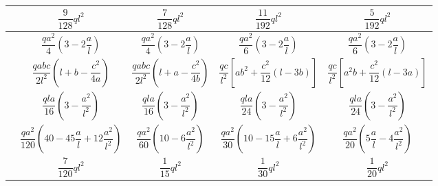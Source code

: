 \begin{table}[H]
{\begin{tabular}{m{4cm}cccc}
         & \large{$\dfrac{9}{128}ql^2$} & \large{$\dfrac{7}{128}ql^2$} & \large{$\dfrac{11}{192}ql^2$} & \large{$\dfrac{5}{192}ql^2$} \\ \midrule
         & \large{$\dfrac{qa^2}{4}\left(3-2\dfrac{a}{l}\right)$} & \large{$\dfrac{qa^2}{4}\left(3-2\dfrac{a}{l}\right)$} & \large{$\dfrac{qa^2}{6}\left(3-2\dfrac{a}{l}\right)$} & \large{$\dfrac{qa^2}{6}\left(3-2\dfrac{a}{l}\right)$} \\ \midrule
         & \large{$\dfrac{qabc}{2l^2}\left(l+b-\dfrac{c^2}{4a}\right)$} & \large{$\dfrac{qabc}{2l^2}\left(l+a-\dfrac{c^2}{4b}\right)$} & \large{$\dfrac{qc}{l^2}\left[ab^2+\dfrac{c^2}{12}\left(l-3b\right)\right]$} & \large{$\dfrac{qc}{l^2}\left[a^2b+\dfrac{c^2}{12}\left(l-3a\right)\right]$} \\ \midrule
         & \large{$\dfrac{qla}{16}\left(3-\dfrac{a^2}{l^2}\right)$} & \large{$\dfrac{qla}{16}\left(3-\dfrac{a^2}{l^2}\right)$} & \large{$\dfrac{qla}{24}\left(3-\dfrac{a^2}{l^2}\right)$} & \large{$\dfrac{qla}{24}\left(3-\dfrac{a^2}{l^2}\right)$} \\ \midrule
         & \large{$\dfrac{qa^2}{120}\left(40-45\dfrac{a}{l}+12\dfrac{a^2}{l^2}\right)$} & \large{$\dfrac{qa^2}{60}\left(10-6\dfrac{a^2}{l^2}\right)$} & \large{$\dfrac{qa^2}{30}\left(10-15\dfrac{a}{l}+6\dfrac{a^2}{l^2}\right)$} & \large{$\dfrac{qa^2}{20}\left(5\dfrac{a}{l}-4\dfrac{a^2}{l^2}\right)$} \\ \midrule
         & \large{$\dfrac{7}{120}ql^2$} & \large{$\dfrac{1}{15}ql^2$} & \large{$\dfrac{1}{30}ql^2$} & \large{$\dfrac{1}{20}ql^2$} \\ \midrule
    \end{tabular}
	} %
    \label{tab:empotPerf}
\end{table}
